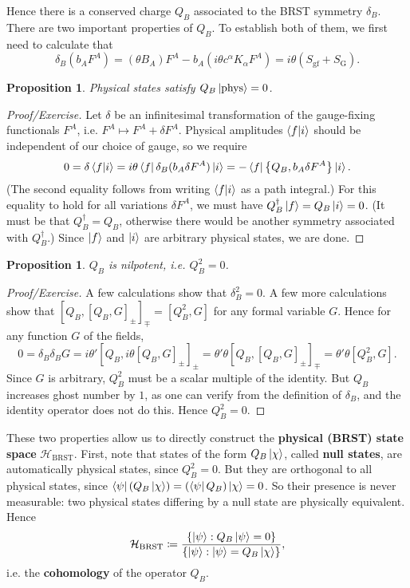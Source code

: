 \documentclass{report}
\theoremstyle{plain}
\newtheorem{proposition}[theorem]{Proposition}
\theoremstyle{definition}
\theoremstyle{remark}
\newcommand{\cH}{\mathcal{H}}
\begin{document}
Hence there is a conserved charge $Q_B$ associated to the BRST
symmetry $\delta_B$. There are two important properties of $Q_B$. To
establish both of them, we first need to calculate that
\[ \delta_B(b_A F^A) = (\theta B_A) F^A - b_A (i\theta c^\alpha K_\alpha F^A) = i\theta (S_{\text{gf}} + S_{\text{G}}). \]

\begin{proposition}
  Physical states satisfy $Q_B\ket{\mathrm{phys}} = 0$.
\end{proposition}

\begin{proof}[Proof/Exercise]
  Let $\delta$ be an infinitesimal transformation of the gauge-fixing
  functionals $F^A$, i.e. $F^A \mapsto F^A + \delta F^A$. Physical
  amplitudes $\braket{f|i}$ should be independent of our choice of
  gauge, so we require
  \[ 0 = \delta \braket{f|i} = i\theta \bra{f}\delta_B(b_A \delta F^A)\ket{i} = -\bra{f}\left\{Q_B, b_A \delta F^A\right\}\ket{i}. \]
  (The second equality follows from writing $\braket{f|i}$ as a path
  integral.) For this equality to hold for all variations $\delta
  F^A$, we must have $Q_B^\dag\ket{f} = Q_B\ket{i} = 0$. (It must be
  that $Q_B^\dag = Q_B$, otherwise there would be another symmetry
  associated with $Q_B^\dag$.) Since $\ket{f}$ and $\ket{i}$ are
  arbitrary physical states, we are done.
\end{proof}

\begin{proposition}
  $Q_B$ is nilpotent, i.e. $Q_B^2 = 0$.
\end{proposition}

\begin{proof}[Proof/Exercise]
  A few calculations show that $\delta_B^2 = 0$. A few more
  calculations show that $[Q_B, [Q_B, G]_{\pm}]_{\mp} = [Q_B^2, G]$
  for any formal variable $G$. Hence for any function $G$ of the
  fields,
  \[ 0 = \delta_B \delta_B G = i\theta' [Q_B, i\theta [Q_B, G]_{\pm}]_{\pm} = \theta' \theta [Q_B, [Q_B, G]_{\pm}]_{\mp} = \theta' \theta [Q_B^2, G]. \]
  Since $G$ is arbitrary, $Q_B^2$ must be a scalar multiple of the
  identity. But $Q_B$ increases ghost number by $1$, as one can verify
  from the definition of $\delta_B$, and the identity operator does
  not do this. Hence $Q_B^2 = 0$.
\end{proof}

These two properties allow us to directly construct the {\bf physical
  (BRST) state space} $\cH_{\text{BRST}}$. First, note that states of
the form $Q_B\ket{\chi}$, called {\bf null states}, are automatically
physical states, since $Q_B^2 = 0$. But they are orthogonal to all
physical states, since $\bra{\psi}(Q_B\ket{\chi}) =
(\bra{\psi}Q_B)\ket{\chi} = 0$. So their presence is never measurable:
two physical states differing by a null state are physically
equivalent. Hence
\[ \cH_{\text{BRST}} \coloneqq \frac{\{\ket{\psi} : Q_B\ket{\psi} = 0\}}{\{\ket{\psi} : \ket{\psi} = Q_B\ket{\chi}\}}, \]
i.e. the {\bf cohomology} of the operator $Q_B$.
\end{document}
